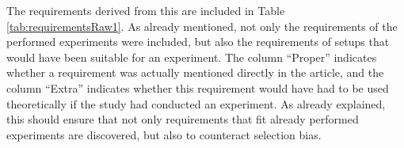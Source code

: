 
The requirements derived from this are included in Table \ref{tab:requirementsRaw1}. As already mentioned, not only the requirements of the performed experiments were included, but also the requirements of setups that would have been suitable for an experiment. The column \enquote{Proper} indicates whether a requirement was actually mentioned directly in the article, and the column \enquote{Extra} indicates whether this requirement would have had to be used theoretically if the study had conducted an experiment. As already explained, this should ensure that not only requirements that fit already performed experiments are discovered, but also to counteract selection bias.


